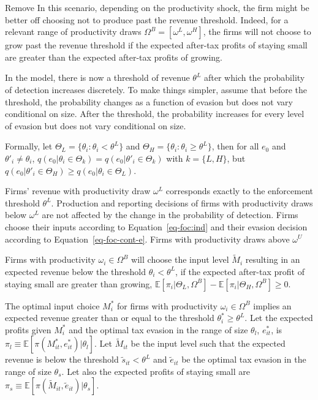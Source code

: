 \documentclass[
  12pt]{article}
\theoremstyle{definition}
\theoremstyle{remark}
\begin{document}
\begin{anfxnote}{Remove}
In this scenario, depending on the productivity shock, the firm might be
better off choosing not to produce past the revenue threshold. Indeed,
for a relevant range of productivity draws
\(\Omega^B=[\omega^L, \omega^H]\), the firms will not choose to grow
past the revenue threshold if the expected after-tax profits of staying
small are greater than the expected after-tax profits of growing.

In the model, there is now a threshold of revenue \(\theta^L\) after
which the probability of detection increases discretely. To make things
simpler, assume that before the threshold, the probability changes as a
function of evasion but does not vary conditional on size. After the
threshold, the probability increases for every level of evasion but does
not vary conditional on size.

Formally, let \(\Theta_{L} = \{\theta_i : \theta_{i} < \theta^L \}\) and
\(\Theta_{H} = \{\theta_i : \theta_{i} \ge \theta^L \}\), then for all
\(e_0\) and \(\theta'_i\not=\theta_i\),
\(q(e_0|\theta_i \in \Theta_k)=q(e_0|\theta'_i \in \Theta_k)\) with
\(k=\{L,H\}\), but
\(q(e_0|\theta'_i \in \Theta_H)\ge q(e_0|\theta_i \in \Theta_L)\).

Firms' revenue with productivity draw \(\omega^L\) corresponds exactly
to the enforcement threshold \(\theta^L\). Production and reporting
decisions of firms with productivity draws below \(\omega^L\) are not
affected by the change in the probability of detection. Firms choose
their inputs according to Equation~\ref{eq-foc:ind} and their evasion
decision according to Equation~\ref{eq-foc-cont-e}. Firms with
productivity draws above \(\omega^U\)

Firms with productivity \(\omega_{i}\in \Omega^B\) will choose the input
level \(\tilde{M}_{i}\) resulting in an expected revenue below the
threshold \(\theta_{i}<\theta^L\), if the expected after-tax profit of
staying small are greater than growing,
\(\mathbb{E}[\pi_{i}|\Theta_L, \Omega^B]-\mathbb{E}[\pi_{i}|\Theta_H, \Omega^B]\ge0\).

The optimal input choice \(M^*_{i}\) for firms with productivity
\(\omega_i\in\Omega^B\) implies an expected revenue greater than or
equal to the threshold \(\theta^*_{i}\ge \theta^L\). Let the expected
profits given \(M^*_{i}\) and the optimal tax evasion in the range of
size \(\theta_l\), \(e^*_{it}\), is
\(\pi_l\equiv\mathbb{E}[\pi(M^*_{it}, e^*_{it})|\theta_l]\). Let
\(\tilde{M}_{it}\) be the input level such that the expected revenue is
below the threshold \(\tilde{s}_{it}<\theta^L\) and \(\tilde{e}_{it}\)
be the optimal tax evasion in the range of size \(\theta_s\). Let also
the expected profits of staying small are
\(\pi_s\equiv\mathbb{E}[\pi(\tilde{M}_{it},\tilde{e}_{it})|\theta_s]\).


\end{anfxnote}
\end{document}

